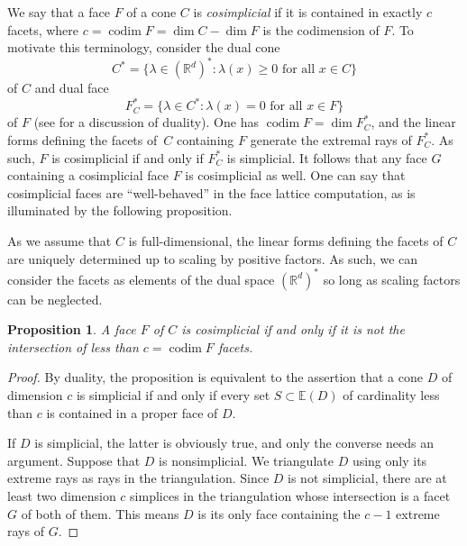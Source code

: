 \documentclass[12pt]{amsart}
\newtheorem{prop}[thm]{Proposition}
\theoremstyle{definition}
\numberwithin{equation}{section}
\newcommand{\ring}[1]{\ensuremath{\mathbb{#1}}}
\renewcommand\>{\rangle}
\newcommand\<{\langle}
\newcommand\0{\mathbf{0}}
\newcommand\RR{\ring{R}}
\def\EE{{\mathbb E}}
\def\codim{\operatorname{codim}}
\begin{document}
We say that a face $F$ of a cone $C$ is \emph{cosimplicial} if it is contained in exactly $c$ facets, where $c = \codim F = \dim C - \dim F$ is the codimension of $F$.  To motivate this terminology, consider the dual cone 
\[
C^* = \{\lambda \in (\RR^d)^* : \lambda(x) \ge 0 \text{ for all } x \in C\}
\]
of $C$ and dual face
\[
F_C^* = \{\lambda \in C^* : \lambda(x) = 0 \text{ for all } x \in F\}
\]
of $F$ (see \cite[Section~1B]{BG} for a discussion of duality).  One has $\codim F = \dim F_C^*$, and the linear forms defining the facets of~$C$ containing $F$ generate the extremal rays of $F_C^*$.  As such, $F$ is cosimplicial if and only if $F_C^*$ is simplicial.  It follows that any face $G$ containing a cosimplicial face $F$ is cosimplicial as well. One can say that cosimplicial faces are ``well-behaved'' in the face lattice computation, as is illuminated by the following proposition. 

As we assume that $C$ is full-dimensional, the linear forms defining the facets of $C$ are uniquely determined up to scaling by positive factors. As such, we can consider the facets as elements of the dual space $(\RR^d)^*$ so long as scaling factors can be neglected.

\begin{prop}\label{p:cosimp}
A face $F$ of $C$ is cosimplicial if and only if it is not the intersection of less than $c=\codim F$ facets.
\end{prop}

\begin{proof}	
By duality, the proposition is equivalent to the assertion that a cone $D$ of dimension $c$ is simplicial if and only if every set $S \subset \EE(D)$ of cardinality less than $c$ is contained in a proper face of $D$.  

If $D$ is simplicial, the latter is obviously true, and only the converse needs an argument. Suppose that $D$ is nonsimplicial.  We triangulate $D$ using only its extreme rays as rays in the triangulation.  Since $D$ is not simplicial, there are at least two dimension $c$ simplices in the triangulation whose intersection is a facet $G$ of both of them.  This means $D$ is its only face containing the $c - 1$ extreme rays of $G$.
\end{proof}
\end{document}
